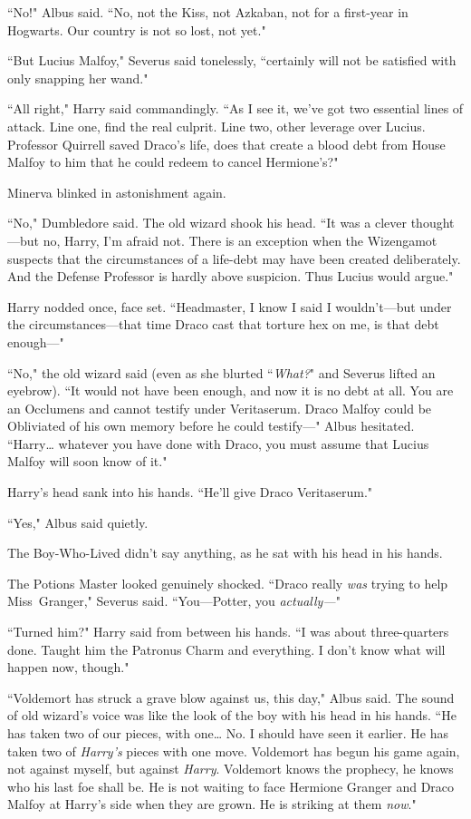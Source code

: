 ``No!" Albus said. ``No, not the Kiss, not Azkaban, not for a first-year in Hogwarts. Our country is not so lost, not yet."

``But Lucius Malfoy," Severus said tonelessly, ``certainly will not be satisfied with only snapping her wand."

``All right," Harry said commandingly. ``As I see it, we've got two essential lines of attack. Line one, find the real culprit. Line two, other leverage over Lucius. Professor Quirrell saved Draco's life, does that create a blood debt from House Malfoy to him that he could redeem to cancel Hermione's?"

Minerva blinked in astonishment again.

``No," Dumbledore said. The old wizard shook his head. ``It was a clever thought—but no, Harry, I'm afraid not. There is an exception when the Wizengamot suspects that the circumstances of a life-debt may have been created deliberately. And the Defense Professor is hardly above suspicion. Thus Lucius would argue."

Harry nodded once, face set. ``Headmaster, I know I said I wouldn't—but under the circumstances—that time Draco cast that torture hex on me, is that debt enough—"

``No," the old wizard said (even as she blurted ``\emph{What?}" and Severus lifted an eyebrow). ``It would not have been enough, and now it is no debt at all. You are an Occlumens and cannot testify under Veritaserum. Draco Malfoy could be Obliviated of his own memory before he could testify—" Albus hesitated. ``Harry{\ldots} whatever you have done with Draco, you must assume that Lucius Malfoy will soon know of it."

Harry's head sank into his hands. ``He'll give Draco Veritaserum."

``Yes," Albus said quietly.

The Boy-Who-Lived didn't say anything, as he sat with his head in his hands.

The Potions Master looked genuinely shocked. ``Draco really \emph{was} trying to help Miss~Granger," Severus said. ``You—Potter, you \emph{actually—}"

``Turned him?" Harry said from between his hands. ``I was about three-quarters done. Taught him the Patronus Charm and everything. I don't know what will happen now, though."

``Voldemort has struck a grave blow against us, this day," Albus said. The sound of old wizard's voice was like the look of the boy with his head in his hands. ``He has taken two of our pieces, with one{\ldots} No. I should have seen it earlier. He has taken two of \emph{Harry's} pieces with one move. Voldemort has begun his game again, not against myself, but against \emph{Harry}. Voldemort knows the prophecy, he knows who his last foe shall be. He is not waiting to face Hermione Granger and Draco Malfoy at Harry's side when they are grown. He is striking at them \emph{now}."

